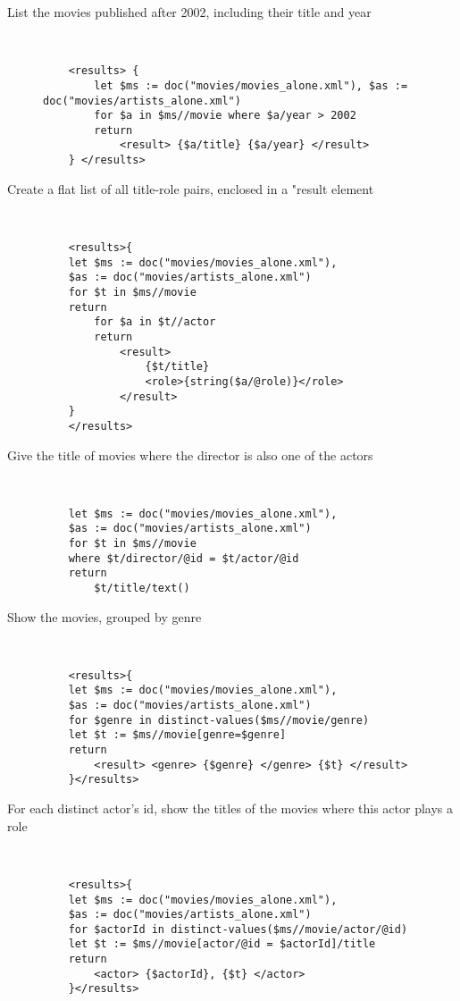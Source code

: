 \documentclass[xPath&xQuery.tex]{subfiles}
\begin{document}
\begin{description}
  \item[List the movies published after 2002, including their title and year] \hfill \\
  \begin{verbatim}
	<results> { 
		let $ms := doc("movies/movies_alone.xml"), $as := doc("movies/artists_alone.xml") 
		for $a in $ms//movie where $a/year > 2002 
		return 
			<result> {$a/title} {$a/year} </result>
	} </results>
  \end{verbatim}

\item[Create a flat list of all title-role pairs, enclosed in a "result element] \hfill \\
  \begin{verbatim}
	<results>{
	let $ms := doc("movies/movies_alone.xml"),
	$as := doc("movies/artists_alone.xml")
	for $t in $ms//movie
	return 
	    for $a in $t//actor
	    return 
	        <result>
	            {$t/title}
	            <role>{string($a/@role)}</role>
	        </result>
	}
	</results>
  \end{verbatim}

\item[Give the title of movies where the director is also one of the actors] \hfill \\
  \begin{verbatim}
	let $ms := doc("movies/movies_alone.xml"),
	$as := doc("movies/artists_alone.xml")
	for $t in $ms//movie
	where $t/director/@id = $t/actor/@id 
	return 
		$t/title/text()
  \end{verbatim}
  
\item[Show the movies, grouped by genre] \hfill \\
  \begin{verbatim}
	<results>{
	let $ms := doc("movies/movies_alone.xml"),
	$as := doc("movies/artists_alone.xml")
	for $genre in distinct-values($ms//movie/genre)
	let $t := $ms//movie[genre=$genre]
	return 
	    <result> <genre> {$genre} </genre> {$t} </result>
	}</results>
  \end{verbatim}
  
\item[For each distinct actor's id, show the titles of the movies where this actor plays a role] \hfill \\
  \begin{verbatim}
	<results>{
	let $ms := doc("movies/movies_alone.xml"),
	$as := doc("movies/artists_alone.xml")
	for $actorId in distinct-values($ms//movie/actor/@id)
	let $t := $ms//movie[actor/@id = $actorId]/title
	return 
	    <actor> {$actorId}, {$t} </actor>
	}</results>
  \end{verbatim}
  

\end{description}
\end{document}
